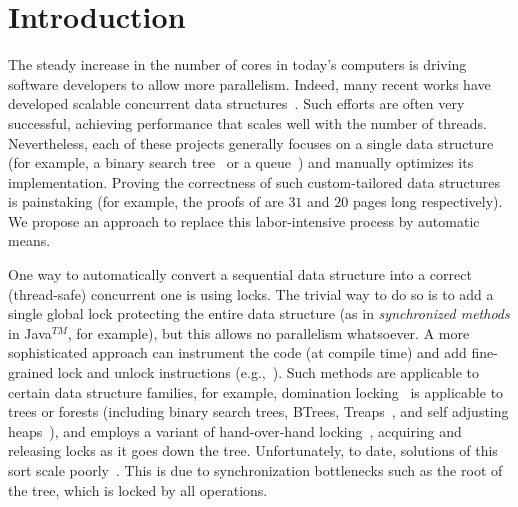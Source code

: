 
\section{Introduction} \label{sec:intro}

The steady increase in the number of  cores in today's computers is driving software developers to allow more parallelism.
Indeed, many recent works have developed scalable concurrent data
structures~\cite{ArbelA2014,DrachslerVY2014,NatarajanM2014,BrownER2014,CrainGR2013,BraginskyP2012,
AfekKKMT2012,EllenFRB2010,BronsonCCO2010,HerlihyLLS2007,Michael:1996}.
Such efforts are often very successful, achieving performance that scales well
with the number of threads.
Nevertheless, each of these projects generally focuses on a single data
structure (for example, a binary search tree~\cite{ArbelA2014} or a queue~\cite{Michael:1996}) and manually optimizes its implementation.
Proving the correctness of such custom-tailored data structures is painstaking
(for example, the proofs of \cite{BraginskyP2012,EllenFRB2010} are $31$ and $20$ pages long
respectively). We propose an approach to replace this labor-intensive process by automatic means.

One way to automatically convert a sequential data structure into a correct
(thread-safe) concurrent one is using locks.
The trivial way to do so is to add a single global lock protecting the entire data structure
(as in \emph{synchronized methods} in Java$^{TM}$, for example), but this allows no parallelism whatsoever.
A more sophisticated approach can instrument the code (at compile time) and add
fine-grained lock and unlock instructions (e.g.,~\cite{Gueta2011,MZGB:POPL06}). Such
methods are applicable to certain data structure families, for example,
domination locking~\cite{Gueta2011} is applicable to trees or forests
(including binary search trees, BTrees, Treaps~\cite{AragonS1989}, and self adjusting heaps~\cite{Sleator:SAH1986:SAH}),
and employs a variant of hand-over-hand locking~\cite{SilberschatzK1980},
acquiring and releasing locks as it goes down the tree.
Unfortunately, to date, solutions of this sort scale poorly~\cite{Gueta2011}.
This is due to synchronization bottlenecks such as the root of the tree,
which is locked by all operations.

